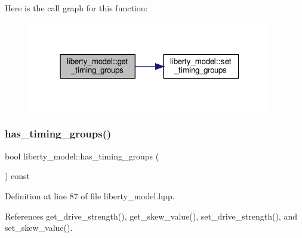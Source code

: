 Here is the call graph for this function\+:
\nopagebreak
\begin{figure}[H]
\begin{center}
\leavevmode
\includegraphics[width=304pt]{d0/dae/classliberty__model_ab261d605fb151cd7bafe4e4185a64e99_cgraph}
\end{center}
\end{figure}
\mbox{\label{classliberty__model_ab2955a2bc5546c99fa44092e349cd20e}} 
\subsubsection{\texorpdfstring{has\+\_\+timing\+\_\+groups()}{has\_timing\_groups()}}
{\footnotesize\ttfamily bool liberty\+\_\+model\+::has\+\_\+timing\+\_\+groups (\begin{DoxyParamCaption}{ }\end{DoxyParamCaption}) const\hspace{0.3cm}{\ttfamily [inline]}}



Definition at line 87 of file liberty\+\_\+model.\+hpp.



References get\+\_\+drive\+\_\+strength(), get\+\_\+skew\+\_\+value(), set\+\_\+drive\+\_\+strength(), and set\+\_\+skew\+\_\+value().

